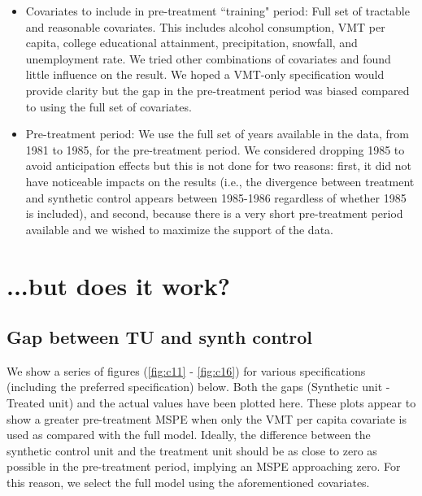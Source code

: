 \documentclass[letterpaper, 12pt]{article}
\begin{document}
\begin{itemize}

\item{Covariates to include in pre-treatment ``training" period: Full set of tractable and reasonable covariates.  This includes alcohol consumption, VMT per capita, college educational attainment, precipitation, snowfall, and unemployment rate.  We tried other combinations of covariates and found little influence on the result.  We hoped a VMT-only specification would provide clarity but the gap in the pre-treatment period was biased compared to using the full set of covariates.}

\item{Pre-treatment period: We use the full set of years available in the data, from 1981 to 1985, for the pre-treatment period.  We considered dropping 1985 to avoid anticipation effects but this is not done for two reasons: first, it did not have noticeable impacts on the results (i.e., the divergence between treatment and synthetic control appears between 1985-1986 regardless of whether 1985 is included), and second, because there is a very short pre-treatment period available and we wished to maximize the support of the data.}

\end{itemize}


\section{...but does it work?}


\subsection{Gap between TU and synth control}

We show a series of figures (\ref{fig:c11} - \ref{fig:c16}) for various specifications (including the preferred specification) below. Both the gaps (Synthetic unit - Treated unit) and the actual values have been plotted here. These plots appear to show a greater pre-treatment MSPE when only the VMT per capita covariate is used as compared with the full model. Ideally, the difference between the synthetic control unit and the treatment unit should be as close to zero as possible in the pre-treatment period, implying an MSPE approaching zero. For this reason, we select the full model using the aforementioned covariates.
\end{document}
